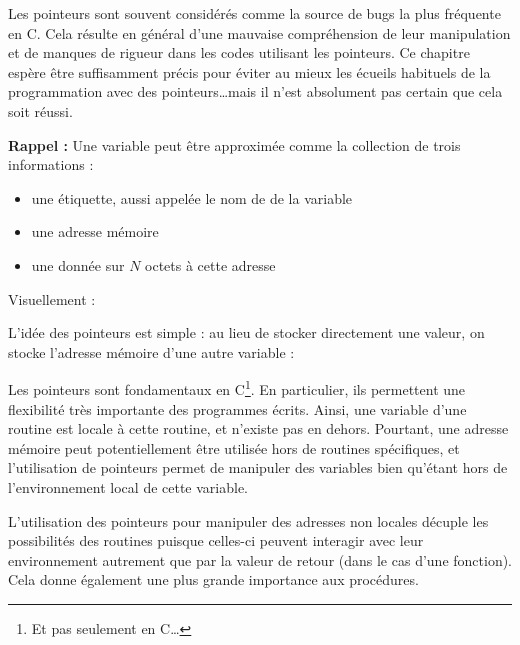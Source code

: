 \documentclass[../../../main.tex]{subfiles}
\begin{document}
Les pointeurs sont souvent considérés comme la source de bugs la plus fréquente en C. Cela résulte en général d'une mauvaise compréhension de leur manipulation et de manques de rigueur dans les codes utilisant les pointeurs.
Ce chapitre espère être suffisamment précis pour éviter au mieux les écueils habituels de la programmation avec des pointeurs\dots mais il n'est absolument pas certain que cela soit réussi.
 
\textbf{Rappel :} Une variable peut être approximée comme la collection de trois informations :
\begin{itemize}
	\item une étiquette, aussi appelée le nom de de la variable
	\item une adresse mémoire
	\item une donnée sur $N$ octets à cette adresse
\end{itemize}
Visuellement : 

\begin{minipage}{\textwidth}
	\begin{center}
		
	\end{center}
\end{minipage} 

L'idée des pointeurs est simple : au lieu de stocker directement une valeur, on stocke l'adresse mémoire d'une autre variable :

\begin{minipage}{\textwidth}
	\begin{center}
		
	\end{center}
\end{minipage}
 
Les pointeurs sont fondamentaux en C\footnote{Et pas seulement en C\dots}. En particulier, ils permettent une flexibilité très importante des programmes écrits. Ainsi, une variable d'une routine est locale à cette routine, et n'existe pas en dehors. Pourtant, une adresse mémoire peut potentiellement être utilisée hors de routines spécifiques, et l'utilisation de pointeurs permet de manipuler des variables bien qu'étant hors de l'environnement local de cette variable.

L'utilisation des pointeurs pour manipuler des adresses non locales décuple les possibilités des routines puisque celles-ci peuvent interagir avec leur environnement autrement que par la valeur de retour (dans le cas d'une fonction). Cela donne également une plus grande importance aux procédures.
\end{document}
